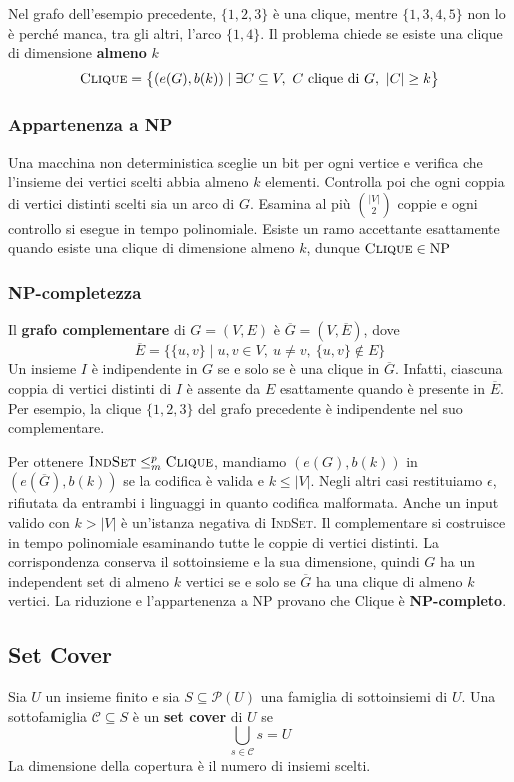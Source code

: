 \medskip
\noindent
Nel grafo dell'esempio precedente, $\{1,2,3\}$ è una clique,
mentre $\{1,3,4,5\}$ non lo è perché manca, tra gli altri,
l'arco $\{1,4\}$. Il problema chiede se esiste una clique
di dimensione \textbf{almeno} $k$
\[
    \textsc{Clique}
    =\bigl\{(e(G),b(k))\mid
        \exists C\subseteq V,\ C\text{ clique di }G,\ |C|\ge k\bigr\}
\]

\subsubsection*{Appartenenza a NP}
Una macchina non deterministica sceglie un bit per ogni
vertice e verifica che l'insieme dei vertici scelti abbia
almeno $k$ elementi. Controlla poi che ogni coppia di vertici
distinti scelti sia un arco di $G$. Esamina al più
$\binom{|V|}{2}$ coppie e ogni controllo si esegue in tempo
polinomiale. Esiste un ramo accettante esattamente quando
esiste una clique di dimensione almeno $k$, dunque
$\textsc{Clique}\in\mathrm{NP}$

\subsubsection*{NP-completezza}
Il \textbf{grafo complementare} di $G=(V,E)$ è
$\overline G=(V,\overline E)$, dove
\[
    \overline E=\bigl\{\{u,v\}\mid
        u,v\in V,\ u\ne v,\ \{u,v\}\notin E\bigr\}
\]
Un insieme $I$ è indipendente in $G$ se e solo se è una clique
in $\overline G$. Infatti, ciascuna coppia di vertici distinti
di $I$ è assente da $E$ esattamente quando è presente in
$\overline E$. Per esempio, la clique $\{1,2,3\}$ del grafo
precedente è indipendente nel suo complementare.

\medskip
\noindent
Per ottenere $\textsc{IndSet}\le_m^p\textsc{Clique}$, mandiamo
$(e(G),b(k))$ in $(e(\overline G),b(k))$ se la codifica è valida
e $k\le |V|$. Negli altri casi restituiamo $\epsilon$, rifiutata
da entrambi i linguaggi in quanto codifica malformata. Anche
un input valido con $k>|V|$ è un'istanza negativa di
\textsc{IndSet}. Il complementare si costruisce in tempo
polinomiale esaminando tutte le coppie di vertici distinti.
La corrispondenza conserva il sottoinsieme e la sua dimensione,
quindi $G$ ha un independent set di almeno $k$ vertici se e
solo se $\overline G$ ha una clique di almeno $k$ vertici.
La riduzione e l'appartenenza a NP provano che Clique è
\textbf{NP-completo}.

\subsection{Set Cover}
\noindent
\colorbox{SALZO}{\parbox{\dimexpr\linewidth-2\fboxsep}{
\begin{definition}
    Sia $U$ un insieme finito e sia $S\subseteq\mathcal{P}(U)$
    una famiglia di sottoinsiemi di $U$. Una sottofamiglia
    $\mathcal{C}\subseteq S$ è un \textbf{set cover} di $U$ se
    \[
        \bigcup_{s\in\mathcal{C}}s=U
    \]
    La dimensione della copertura è il numero di insiemi scelti.
\end{definition}
}}%

